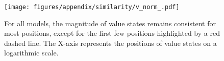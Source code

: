 \begin{figure}[ht]
    \centering
    \texttt{[image: figures/appendix/similarity/v\_norm\_.pdf]}
    \caption{For all models, the magnitude of value states remains consistent for most positions, except for the first few positions highlighted by a red dashed line. The X-axis represents the positions of value states on a logarithmic scale.} 
    \label{fig:app:norm:v}
\end{figure}